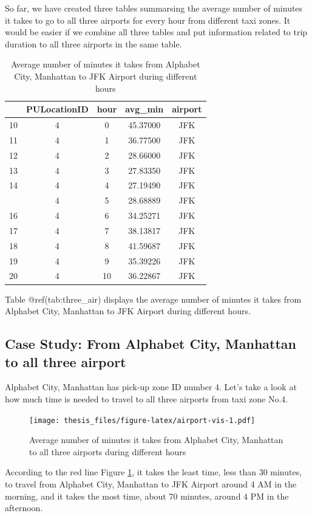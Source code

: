 \documentclass[12pt,twoside]{reedthesis}
\newenvironment{Shaded}{\begin{snugshade}}{\end{snugshade}}
\newcommand{\KeywordTok}[1]{\textcolor[rgb]{0.13,0.29,0.53}{\textbf{#1}}}
\newcommand{\DecValTok}[1]{\textcolor[rgb]{0.00,0.00,0.81}{#1}}
\newcommand{\StringTok}[1]{\textcolor[rgb]{0.31,0.60,0.02}{#1}}
\newcommand{\OperatorTok}[1]{\textcolor[rgb]{0.81,0.36,0.00}{\textbf{#1}}}
\newcommand{\NormalTok}[1]{#1}
\theoremstyle{definition}
\theoremstyle{definition}
\theoremstyle{definition}
\theoremstyle{remark}
\begin{document}
So far, we have created three tables summarsing the average number of
minutes it takes to go to all three airports for every hour from
different taxi zones. It would be easier if we combine all three tables
and put information related to trip duration to all three airports in
the same table.
\begin{table}

\caption{\label{tab:unnamed-chunk-60}Average number of minutes it takes from Alphabet City, Manhattan to JFK Airport during different hours}
\centering
\begin{tabular}[t]{lcccc}
\toprule
  & PULocationID & hour & avg\_min & airport\\
\midrule
10 & 4 & 0 & 45.37000 & JFK\\
11 & 4 & 1 & 36.77500 & JFK\\
12 & 4 & 2 & 28.66000 & JFK\\
13 & 4 & 3 & 27.83350 & JFK\\
14 & 4 & 4 & 27.19490 & JFK\\
\addlinespace
15 & 4 & 5 & 28.68889 & JFK\\
16 & 4 & 6 & 34.25271 & JFK\\
17 & 4 & 7 & 38.13817 & JFK\\
18 & 4 & 8 & 41.59687 & JFK\\
19 & 4 & 9 & 35.39226 & JFK\\
20 & 4 & 10 & 36.22867 & JFK\\
\bottomrule
\end{tabular}
\end{table}
Table @ref(tab:three\_air) displays the average number of minutes it
takes from Alphabet City, Manhattan to JFK Airport during different
hours.

\subsection{Case Study: From Alphabet City, Manhattan to all three
airport}\label{case-study-from-alphabet-city-manhattan-to-all-three-airport}

Alphabet City, Manhattan has pick-up zone ID number 4. Let's take a look
at how much time is needed to travel to all three airports from taxi
zone No.4.
\begin{Shaded}
\end{Shaded}
\begin{figure}
\centering
\texttt{[image: thesis\_files/figure-latex/airport-vis-1.pdf]}
\caption{\label{fig:airport-vis}Average number of minutes it takes from
Alphabet City, Manhattan to all three airports during different hours}
\end{figure}
According to the red line Figure \ref{fig:airport-vis}, it takes the
least time, less than 30 minutes, to travel from Alphabet City,
Manhattan to JFK Airport around 4 AM in the morning, and it takes the
most time, about 70 minutes, around 4 PM in the afternoon.
\end{document}
